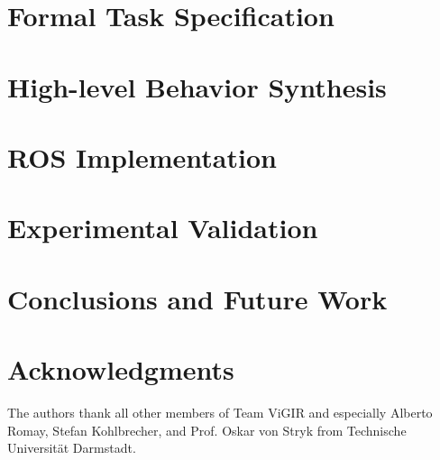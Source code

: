 \documentclass[letterpaper, 10 pt, conference]{ieeeconf}	%
\begin{document}
\section{Formal Task Specification}\label{S:ltl}

%
\section{High-level Behavior Synthesis}\label{S:synthesis}

%
\section{ROS Implementation}\label{S:implementation}

%
\section{Experimental Validation}\label{S:experiments}

%
\section{Conclusions and Future Work}\label{S:conclusion}

%
\section*{Acknowledgments}
The authors thank all other members of Team ViGIR and especially Alberto Romay, Stefan Kohlbrecher, and Prof. Oskar von Stryk from Technische Universit\"{a}t Darmstadt.
%
%


%
\end{document}

